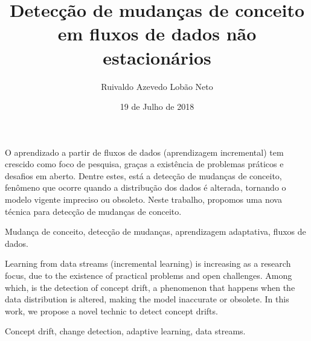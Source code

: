 \documentclass[qual, classic, a4paper]{ufbathesis}
\institute{Instituto de Matem\'{a}tica}
\title{Detecção de mudanças de conceito em fluxos de dados não estacionários}
\date{19 de Julho de 2018}
\author{Ruivaldo Azevedo Lobão Neto}
\begin{document}
\pgcompfrontpage

\frontmatter

\pgcomppresentationpage



\resumo
O aprendizado a partir de fluxos de dados (aprendizagem incremental) tem crescido como foco de pesquisa, graças a existência de problemas práticos e desafios em aberto.
Dentre estes, está a detecção de mudanças de conceito, fenômeno que ocorre quando a distribução dos dados é alterada, tornando o modelo vigente impreciso ou obsoleto.
Neste trabalho, propomos uma nova técnica para detecção de mudanças de conceito.

\begin{keywords}
Mudança de conceito, detecção de mudanças, aprendizagem adaptativa, fluxos de dados.
\end{keywords}


\abstract
Learning from data streams (incremental learning) is increasing as a research focus, due to the existence of practical problems and open challenges. Among which, is the detection of concept drift, a phenomenon that happens when the data distribution is altered, making the model inaccurate or obsolete. In this work, we propose a novel technic to detect concept drifts.

\begin{keywords}
Concept drift, change detection, adaptive learning, data streams.
\end{keywords}


\tableofcontents




\end{document}
